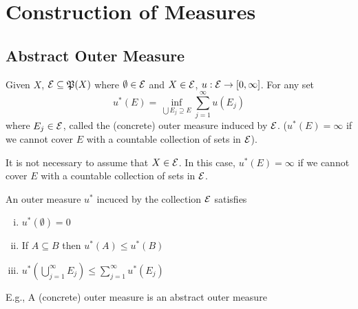 \chapter{Construction of Measures}
\section{Abstract Outer Measure}




\begin{definition}
  Given $X$, $\mathcal E \subseteq \mathfrak{P}(X)$ where $\emptyset \in \mathcal E$ and $X \in \mathcal E$, $u: \mathcal E \to [0, \infty]$.
  For any set 
  \[u^*(E) = \inf_{\bigcup E_j \supseteq E}\sum_{j=1}^\infty u(E_j)\]
  where $E_j \in \mathcal E$, called the (concrete) outer measure induced by $\mathcal E$.
  ($u^*(E) = \infty$ if we cannot cover $E$ with a countable collection of sets in $\mathcal E$).
\end{definition}

\begin{remark}
  It is not necessary to assume that $X \in \mathcal E$.
  In this case, $u^*(E) = \infty$ if we cannot cover $E$ with a countable collection of sets in $\mathcal E$.
\end{remark}

\begin{lemma}
  An outer measure $u^*$ incuced by the collection $\mathcal E$ satisfies
  \begin{enumerate}[(i)]
    \item $u^*(\emptyset) = 0$
    \item If $A \subseteq B$ then $u^*(A) \le u^*(B)$
    \item $u^*(\bigcup_{j=1}^\infty E_j) \le \sum_{j=1}^\infty u^*(E_j)$ 
  \end{enumerate}
  E.g., A (concrete) outer measure is an abstract outer measure
\end{lemma}

